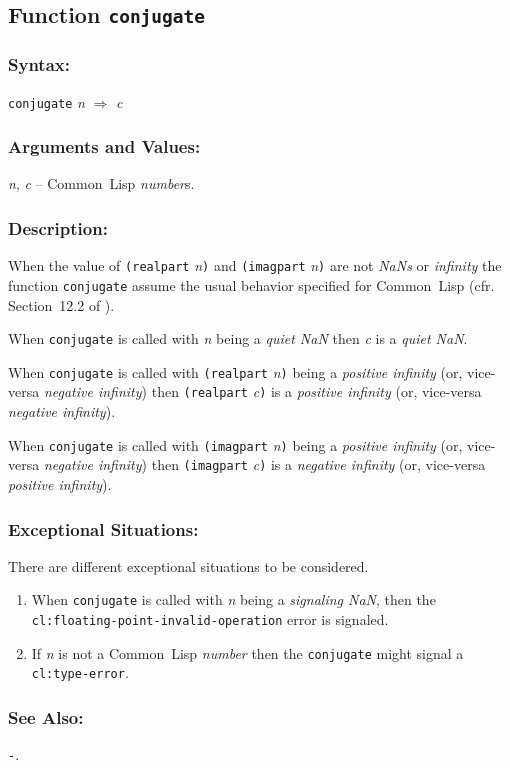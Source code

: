 \documentclass[10pt,fleqn]{article}
\newcommand{\CL}{\textsf{Common~Lisp}}
\newcommand{\code}[1]{\texttt{#1}}
\newcommand{\clieeeterm}[1]{\textit{#1}}
\newcommand{\varname}[1]{\textit{#1}}
\newcommand{\clterm}[1]{\textit{#1}}
\newcommand{\clname}[1]{\texttt{#1}}
\newcommand{\RArrow}{$\Rightarrow$}
\newcommand{\DDictionaryItem}[1]{\vspace*{6pt}\noindent\hrulefill\vspace*{-9pt}\subsection*{#1}}
\newcommand{\DSyntax}{\subsubsection*{Syntax:}}
\newcommand{\DArgsNValues}{\subsubsection*{Arguments and Values:}}
\newcommand{\DDescription}{\subsubsection*{Description:}}
\newcommand{\DExceptional}{\subsubsection*{Exceptional Situations:}}
\newcommand{\DSeeAlso}{\subsubsection*{See Also:}}
\begin{document}
\DDictionaryItem{Function \code{conjugate}}
\index{C!\code{conjugate}}

\DSyntax{}

\code{conjugate} \varname{n} \RArrow{} \varname{c}

\DArgsNValues{}

\varname{n}, \varname{c} -- \CL{} \clterm{number}s.

\DDescription{}

When the value of \code{(realpart} \varname{n}\code{)} and
\code{(imagpart} \varname{n}\code{)} are not
\clieeeterm{NaNs} or \clieeeterm{infinity} the function
\code{conjugate} assume the usual behavior specified for \CL{} (cfr.
Section~12.2 of \cite{1996:ANSIHyperSpec}).

When \code{conjugate} is called with \varname{n} being a
\clieeeterm{quiet NaN} then \varname{c} is a
\clieeeterm{quiet NaN}.

When \code{conjugate} is called with \code{(realpart}
\varname{n}\code{)}  being a \clieeeterm{positive infinity} (or,
vice-versa \clieeeterm{negative infinity}) then 
\code{(realpart} \varname{c}\code{)} is a
\clieeeterm{positive infinity} (or, vice-versa \clieeeterm{negative
  infinity}).

When \code{conjugate} is called with \code{(imagpart}
\varname{n}\code{)}  being a \clieeeterm{positive infinity} (or,
vice-versa \clieeeterm{negative infinity}) then 
\code{(imagpart} \varname{c}\code{)} is a
\clieeeterm{negative infinity} (or, vice-versa \clieeeterm{positive
infinity}).

\DExceptional{}


There are different exceptional situations to be considered.

\begin{enumerate}
\item When \code{conjugate} is called with 
  \varname{n} being a \emph{signaling NaN}, then the
  \clname{cl:floating-point-invalid-operation} error is signaled.

\item If \varname{n} is not a \CL{} \clterm{number}
  then the \code{conjugate}
  might signal a \clname{cl:type-error}.
\end{enumerate}

\DSeeAlso{}

\code{-}.


\newpage

\end{document}
